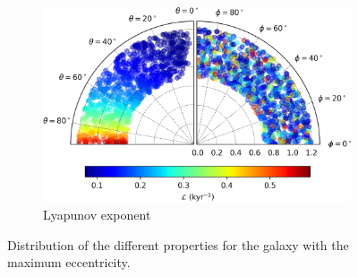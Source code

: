 \begin{figure}[h]
\begin{subfigure}[t]{0.6\textwidth}
			\includegraphics[width=\textwidth]{"../Files/Week 13/biggerE_lyapunov"}
			\caption{Lyapunov exponent}
			\label{fig: biggerE_lyapunov}
		\end{subfigure}
		\caption{Distribution of the different properties for the galaxy with the maximum eccentricity.}
		\label{fig: biggerE}
	\end{figure}


